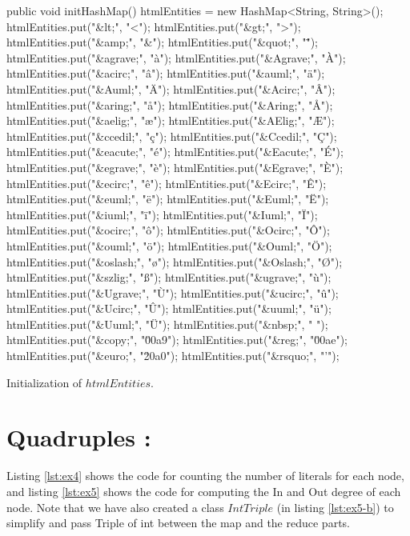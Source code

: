 \documentclass[a4paper,11pt]{report}
\begin{document}
\begin{listing}[ht]
\centering
\begin{javacode}
  public void initHashMap() {
            htmlEntities = new HashMap<String, String>();
            htmlEntities.put("&lt;", "<"); htmlEntities.put("&gt;", ">");
            htmlEntities.put("&amp;", "&"); htmlEntities.put("&quot;", "\"");
            htmlEntities.put("&agrave;", "à"); htmlEntities.put("&Agrave;", "À");
            htmlEntities.put("&acirc;", "â"); htmlEntities.put("&auml;", "ä");
            htmlEntities.put("&Auml;", "Ä"); htmlEntities.put("&Acirc;", "Â");
            htmlEntities.put("&aring;", "å"); htmlEntities.put("&Aring;", "Å");
            htmlEntities.put("&aelig;", "æ"); htmlEntities.put("&AElig;", "Æ");
            htmlEntities.put("&ccedil;", "ç"); htmlEntities.put("&Ccedil;", "Ç");
            htmlEntities.put("&eacute;", "é"); htmlEntities.put("&Eacute;", "É");
            htmlEntities.put("&egrave;", "è"); htmlEntities.put("&Egrave;", "È");
            htmlEntities.put("&ecirc;", "ê"); htmlEntities.put("&Ecirc;", "Ê");
            htmlEntities.put("&euml;", "ë"); htmlEntities.put("&Euml;", "Ë");
            htmlEntities.put("&iuml;", "ï"); htmlEntities.put("&Iuml;", "Ï");
            htmlEntities.put("&ocirc;", "ô"); htmlEntities.put("&Ocirc;", "Ô");
            htmlEntities.put("&ouml;", "ö"); htmlEntities.put("&Ouml;", "Ö");
            htmlEntities.put("&oslash;", "ø"); htmlEntities.put("&Oslash;", "Ø");
            htmlEntities.put("&szlig;", "ß"); htmlEntities.put("&ugrave;", "ù");
            htmlEntities.put("&Ugrave;", "Ù"); htmlEntities.put("&ucirc;", "û");
            htmlEntities.put("&Ucirc;", "Û"); htmlEntities.put("&uuml;", "ü");
            htmlEntities.put("&Uuml;", "Ü"); htmlEntities.put("&nbsp;", " ");
            htmlEntities.put("&copy;", "\u00a9"); htmlEntities.put("&reg;", "\u00ae");
            htmlEntities.put("&euro;", "\u20a0"); htmlEntities.put("&rsquo;", "'");
        }
\end{javacode}
\caption{Initialization of $htmlEntities$.}
\label{lst:ex3-b}
\end{listing}

\section*{Quadruples : }

Listing \ref{lst:ex4} shows the code for counting the number of literals for
each node, and listing \ref{lst:ex5} shows the code for computing the In and Out
degree of each node. Note that we have also created a class $IntTriple$ (in
listing \ref{lst:ex5-b}) to simplify and pass Triple of int between the map and
the reduce parts.
\end{document}
